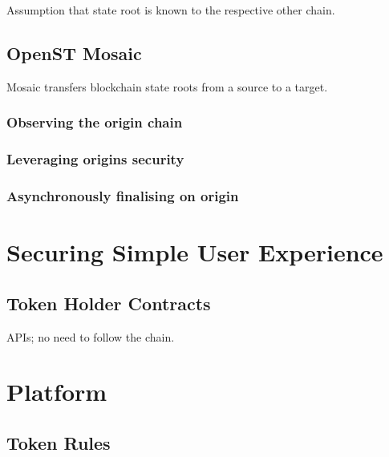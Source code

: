 \documentclass[12pt,a4paper,draft]{article}
\begin{document}
Assumption that state root is known to the respective other chain.

\subsection{OpenST Mosaic}

Mosaic transfers blockchain state roots from a source to a target.

%

\subsubsection{Observing the origin chain}

\subsubsection{Leveraging origins security}

\subsubsection{Asynchronously finalising on origin}

\section{Securing Simple User Experience}

\subsection{Token Holder Contracts}

APIs; no need to follow the chain.

\section{Platform}

\subsection{Token Rules}
\end{document}
